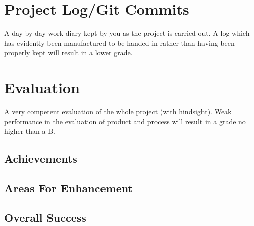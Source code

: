 \documentclass[runningheads,a4paper]{llncs}
\begin{document}
\section{Project Log/Git Commits}
A day-by-day work diary kept by you as the project is carried out. A log which has evidently been manufactured to be handed in rather than having been properly kept will result in a lower grade.
	
\section{Evaluation}
A very competent evaluation of the whole project (with hindsight). Weak performance in the evaluation of product and process will result in a grade no higher than a B.

	\subsection{Achievements}
	\subsection{Areas For Enhancement}
	\subsection{Overall Success}

\newpage


\end{document}
